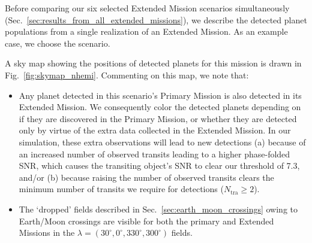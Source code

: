 Before comparing our six selected Extended Mission scenarios simultaneously (Sec.~\ref{sec:results_from_all_extended_missions}), we describe the detected planet populations from a single realization of an Extended Mission.
As an example case, we choose the \nhemi\:scenario.

A sky map showing the positions of detected planets for this mission is drawn in Fig.~\ref{fig:skymap_nhemi}.
Commenting on this map, we note that:
\begin{itemize}
	\item Any planet detected in this scenario's Primary Mission is also detected in its Extended Mission.
	We consequently color the detected planets depending on if they are discovered in the Primary Mission, or whether they are detected only by virtue of the extra data collected in the Extended Mission.
	In our simulation, these extra observations will lead to new detections (a) because of an increased number of observed transits leading to a higher phase-folded SNR, which causes the transiting object's SNR to clear our threshold of 7.3, and/or (b) because raising the number of observed transits clears the minimum number of transits we require for detections ($N_\mathrm{tra} \geq 2$).
	\item The `dropped' fields described in Sec.~\ref{sec:earth_moon_crossings} owing to Earth/Moon crossings are visible for both the primary and Extended Missions in the $\lambda=(30^\circ, 0^\circ, 330^\circ, 300^\circ)$ fields.
\end{itemize}

